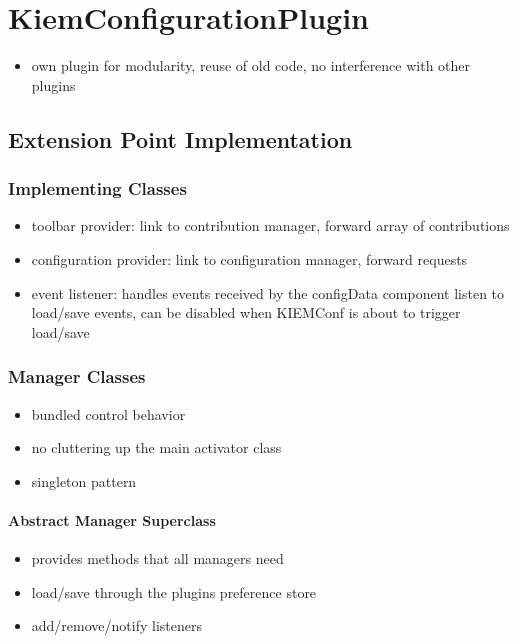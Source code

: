 \chapter{KiemConfigurationPlugin}
\label{chapter:KiemConfig}
\begin{itemize}
 \item own plugin for modularity, reuse of old code, no interference with other plugins
\end{itemize}

\section{Extension Point Implementation}
\subsection{Implementing Classes}
\begin{itemize}
 \item toolbar provider: link to contribution manager, forward array of contributions
 \item configuration provider: link to configuration manager, forward requests
 \item event listener: handles events received by the configData component 
    listen to load/save events, can be disabled when KIEMConf is about to trigger load/save
\end{itemize}

\subsection{Manager Classes}
\begin{itemize}
 \item bundled control behavior 
 \item no cluttering up the main activator class
 \item singleton pattern
\end{itemize}
\subsubsection{Abstract Manager Superclass}
\begin{itemize}
 \item provides methods that all managers need
 \item load/save through the plugins preference store
 \item add/remove/notify listeners
\end{itemize}

